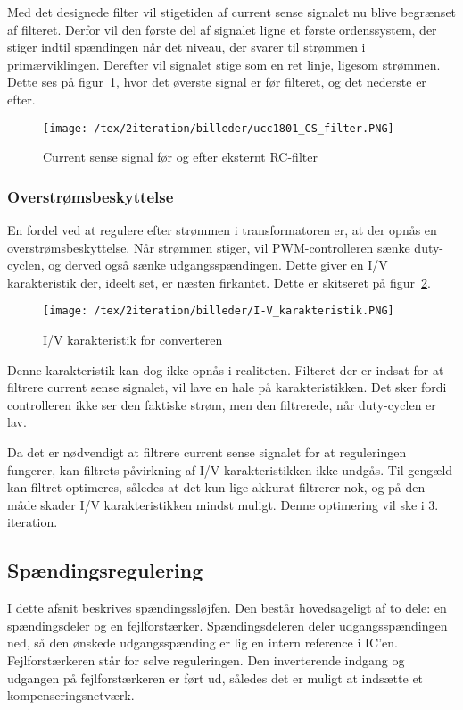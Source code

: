 \noindent Med det designede filter vil stigetiden af current sense signalet nu blive begrænset af filteret. Derfor vil den første del af signalet ligne et første ordenssystem, der stiger indtil spændingen når det niveau, der svarer til strømmen i primærviklingen. Derefter vil signalet stige som en ret linje, ligesom strømmen. Dette ses på figur~\ref{fig:ucc1801_CS_filter}, hvor det øverste signal er før filteret, og det nederste er efter.

\begin{figure}[H]
	\center
	\texttt{[image: /tex/2iteration/billeder/ucc1801\_CS\_filter.PNG]}
	\caption{Current sense signal før og efter eksternt RC-filter}
	\label{fig:ucc1801_CS_filter}
\end{figure}

\subsubsection{Overstrømsbeskyttelse} \label{CS_protection}
\noindent En fordel ved at regulere efter strømmen i transformatoren er, at der opnås en overstrømsbeskyttelse. Når strømmen stiger, vil PWM-controlleren sænke duty-cyclen, og derved også sænke udgangsspændingen. Dette giver en I/V karakteristik der, ideelt set, er næsten firkantet. Dette er skitseret på figur~\ref{fig:I-V_karateristik}. 

\begin{figure}[H]
	\center
	\texttt{[image: /tex/2iteration/billeder/I-V\_karakteristik.PNG]}
	\caption{I/V karakteristik for converteren}
	\label{fig:I-V_karateristik}
\end{figure}

\noindent Denne karakteristik kan dog ikke opnås i realiteten. Filteret der er indsat for at filtrere current sense signalet, vil lave en hale på karakteristikken. Det sker fordi controlleren ikke ser den faktiske strøm, men den filtrerede, når duty-cyclen er lav. 

Da det er nødvendigt at filtrere current sense signalet for at reguleringen fungerer, kan filtrets påvirkning af I/V karakteristikken ikke undgås. Til gengæld kan filtret optimeres, således at det kun lige akkurat filtrerer nok, og på den måde skader I/V karakteristikken mindst muligt. Denne optimering vil ske i 3. iteration. 

\subsection{Spændingsregulering} \label{V_loop}
I dette afsnit beskrives spændingssløjfen. Den består hovedsageligt af to dele: en spændingsdeler og en fejlforstærker. Spændingsdeleren deler udgangsspændingen ned, så den ønskede udgangsspænding er lig en intern reference i IC'en. Fejlforstærkeren står for selve reguleringen. Den inverterende indgang og udgangen på fejlforstærkeren er ført ud, således det er muligt at indsætte et kompenseringsnetværk.

